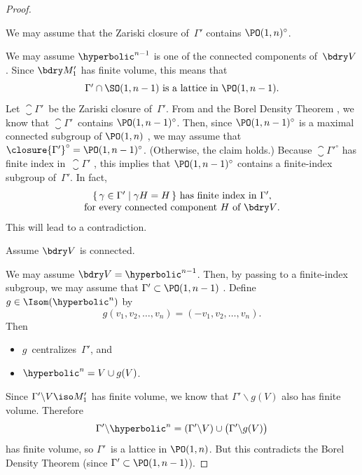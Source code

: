 \begin{proof}
\begin{claim}
 We may assume that the Zariski closure of\/~$\Gamma'$
contains $\PO(1,n)^\circ$.
 \end{claim}
 We may assume $\hyperbolic^{n-1}$ is one of the connected
components of~$\bdry V$. Since $\bdry M_1'$ has finite
volume, this means that
 \begin{equation} \label{ArithHybridPf-BdryLatt}
 \mbox{$\Gamma' \cap \SO(1,n-1)$ is a lattice in
$\PO(1,n-1)$.}
 \end{equation}
 Let $\closure{\Gamma'}$~be the Zariski closure
of~$\Gamma'$. From  and the
Borel Density Theorem , we know that
$\closure{\Gamma'}$~contains $\PO(1,n-1)^\circ$. Then,
since $\PO(1,n-1)^\circ$ is a maximal connected subgroup of
$\PO(1,n)$ , we may assume that
$\closure{\Gamma'}^\circ = \PO(1,n-1)^\circ$. (Otherwise,
the claim holds.) Because $\closure{\Gamma'}^\circ$ has
finite index in~$\closure{\Gamma'}$ , this
implies that $\PO(1,n-1)^\circ$ contains a finite-index
subgroup of~$\Gamma'$. In fact, 
 \begin{equation} \label{ArithHybridPf-FinInd}
 \begin{matrix}
 \text{$\{\, \gamma \in \Gamma' \mid \gamma H = H \,\}$ has
finite index in $\Gamma'$,}
\\ \text{for every connected component~$H$
of~$\bdry V$} .
\end{matrix}
 \end{equation}
 This will lead to a contradiction.

\setcounter{case}{0}

\begin{case}
 Assume $\bdry V$ is connected.
 \end{case}
 We may assume $\bdry V = \hyperbolic^{n-1}$. Then, by
passing to a finite-index subgroup, we may assume that
$\Gamma' \subset \PO(1,n-1)$ .
 Define $g \in \Isom(\hyperbolic^n)$ by
 $$g(v_1,v_2,\ldots,v_n) = (-v_1,v_2,\ldots,v_n) .$$
 Then
 \begin{itemize}
 \item $g$~centralizes~$\Gamma'$, and
 \item $\hyperbolic^n = V \cup g(V)$.
 \end{itemize}
  Since $\Gamma' \backslash V \iso M_1'$ has finite
volume, we know that $\Gamma' \backslash g(V)$ also has
finite volume. Therefore
 $$ \Gamma' \backslash \hyperbolic^n 
 = (\Gamma' \backslash V) \cup \bigl( \Gamma' \backslash
g(V) \bigr) $$
 has finite volume, so $\Gamma'$~is a lattice in
$\PO(1,n)$. But this contradicts the Borel Density Theorem
 (since $\Gamma' \subset \PO(1,n-1)$).


\end{proof}
